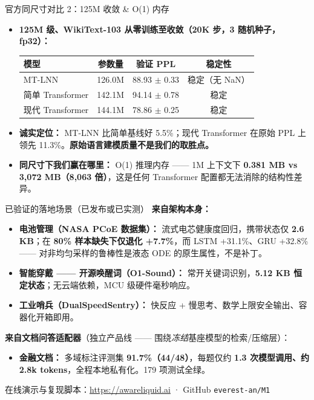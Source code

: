 \documentclass[aspectratio=169, 10pt]{beamer}
\begin{document}
\begin{frame}{官方同尺寸对比 2：125M 收敛 \& O(1) 内存}
\small
\begin{itemize}\itemsep=0.3em
    \item \textbf{125M 级、WikiText-103 从零训练至收敛（20K 步，3 随机种子，fp32）：}
    \begin{center}
    \begin{tabular}{lccc}
    \toprule
    \textbf{模型} & \textbf{参数量} & \textbf{验证 PPL} & \textbf{稳定性} \\
    \midrule
    MT-LNN & 126.0M & 88.93 $\pm$ 0.33 & 稳定（无 NaN） \\
    简单 Transformer & 142.1M & 94.14 $\pm$ 0.78 & 稳定 \\
    现代 Transformer & 144.1M & 78.86 $\pm$ 0.25 & 稳定 \\
    \bottomrule
    \end{tabular}
    \end{center}
    \item \textbf{诚实定位：} MT-LNN 比简单基线好 5.5\%；现代 Transformer 在原始 PPL 上领先 11.3\%。\textbf{原始语言建模质量不是我们的取胜点。}
    \item \textbf{同尺寸下我们赢在哪里：} O(1) 推理内存 —— 1M 上下文下 \textbf{0.381 MB vs 3{,}072 MB（8{,}063 倍）}，这是任何 Transformer 配置都无法消除的结构性差异。
\end{itemize}
\end{frame}

\begin{frame}{已验证的落地场景（已发布或已实测）}
\small
\textbf{来自架构本身：}
\begin{itemize}\itemsep=0.4em
    \item \textbf{电池管理（NASA PCoE 数据集）：} 流式电芯健康度回归，携带状态仅 \textbf{2.6 KB}；在 \textbf{80\% 样本缺失下仅退化 +7.7\%}，而 LSTM +31.1\%、GRU +32.8\% —— 对非均匀采样的鲁棒性是液态 ODE 的原生属性，不是补丁。
    \item \textbf{智能穿戴 —— 开源唤醒词（O1-Sound）：} 常开关键词识别，\textbf{5.12 KB 恒定状态}；无云端依赖，MCU 级硬件毫秒响应。
    \item \textbf{工业哨兵（DualSpeedSentry）：} 快反应 + 慢思考、数学上限安全输出、容器化开箱即用。
\end{itemize}
\vspace{0.2em}
\textbf{来自文档问答适配器}（独立产品线 —— 围绕\emph{冻结}基座模型的检索/压缩层）：
\begin{itemize}\itemsep=0.4em
    \item \textbf{金融文档：} 多域标注评测集 \textbf{91.7\%（44/48）}，每题仅约 \textbf{1.3 次模型调用、约 2.8k tokens}，全程本地私有化。179 项测试全绿。
\end{itemize}
\vspace{0.2em}
{\footnotesize 在线演示与复现脚本：\url{https://awareliquid.ai} · GitHub \texttt{everest-an/M1}}
\end{frame}
\end{document}
